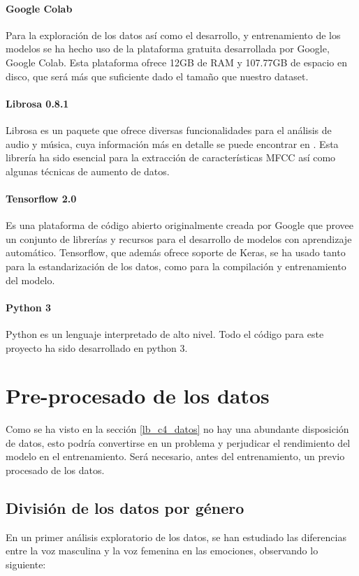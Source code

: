 \documentclass[11pt,a4paper,spanish]{book}
\begin{document}
	
	\paragraph{Google Colab} Para la exploración de los datos así como el desarrollo, y entrenamiento de los modelos se ha hecho uso de la plataforma gratuita desarrollada por Google, Google Colab. Esta plataforma ofrece 12GB de RAM  y 107.77GB de espacio en disco, que será más que suficiente dado el tamaño que nuestro dataset.
	
	\paragraph{Librosa 0.8.1} Librosa es un paquete que ofrece diversas funcionalidades para el análisis de audio y música, cuya información más en detalle se puede encontrar en \cite{librosa082}. Esta librería ha sido esencial para la extracción de características MFCC así como algunas técnicas de aumento de datos.
	
	\paragraph{Tensorflow 2.0} Es una plataforma de código abierto originalmente creada por Google que provee un conjunto de librerías y recursos para el desarrollo de modelos con aprendizaje automático. Tensorflow, que además ofrece soporte de Keras, se ha usado tanto para la estandarización de los datos, como para la compilación y entrenamiento del modelo.
	
	\paragraph{Python 3} Python es un lenguaje interpretado de alto nivel. Todo el código para este proyecto ha sido desarrollado en python 3.
	
	\section{Pre-procesado de los datos}
	Como se ha visto en la sección \ref{lb_c4_datos} no hay una abundante disposición de datos, esto podría convertirse en un problema y perjudicar el rendimiento del modelo en el entrenamiento. 
	Será necesario, antes del entrenamiento, un previo procesado de los datos.
	
	\subsection{División de los datos por género}
	En un primer análisis exploratorio de los datos, se han estudiado las diferencias entre la voz masculina y la voz femenina en las emociones, observando lo siguiente:
	
\end{document}
